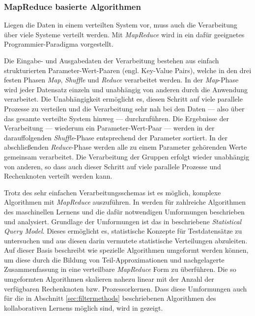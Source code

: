 \subsubsection{MapReduce basierte Algorithmen}\label{sec:mapred}

Liegen die Daten in einem verteilten System vor, muss auch die Verarbeitung über viele Systeme verteilt werden. Mit \textit{MapReduce} wird in \citep{mapred04} ein dafür geeignetes Programmier-Paradigma vorgestellt. 

 Die Eingabe- und Ausgabedaten der Verarbeitung bestehen aus einfach strukturierten Parameter-Wert-Paaren (engl. Key-Value Pairs), welche in den drei festen Phasen \textit{Map}, \textit{Shuffle} und \textit{Reduce} verarbeitet werden. In der \textit{Map}-Phase wird jeder Datensatz einzeln und unabhängig von anderen durch die Anwendung verarbeitet. Die Unabhängigkeit ermöglicht es, diesen Schritt auf viele parallele Prozesse zu verteilen und die Verarbeitung sehr nah bei den Daten --- also über das gesamte verteilte System hinweg --- durchzuführen. Die Ergebnisse der Verarbeitung --- wiederum ein Parameter-Wert-Paar --- werden in der darauffolgenden  \textit{Shuffle}-Phase entsprechend der Parameter sortiert. In der abschließenden  \textit{Reduce}-Phase werden alle zu einem Parameter gehörenden Werte gemeinsam verarbeitet. Die Verarbeitung der Gruppen erfolgt wieder unabhängig von anderen, so dass auch dieser Schritt auf viele parallele Prozesse und Rechenknoten verteilt werden kann. \citep{mapred04} 

Trotz des sehr einfachen Verarbeitungsschemas ist es möglich, komplexe Algorithmen mit \textit{MapReduce} auszuführen. In \citep{mapred06} werden für zahlreiche Algorithmen des maschinellen Lernens und die dafür notwendigen Umformungen beschrieben und analysiert. Grundlage der Umformungen ist das in \citep{Kearns98} beschriebene \textit{Statistical Query Model}. Dieses ermöglicht es, statistische Konzepte für Testdatensätze zu untersuchen und aus diesen darin vermutete statistische Verteilungen abzuleiten. Auf dieser Basis beschreibt \citep{mapred06} wie spezielle Algorithmen umgeformt werden können, um diese durch die Bildung von Teil-Approximationen und nachgelagerte Zusammenfassung in eine verteilbare \textit{MapReduce} Form zu überführen. Die so umgeformten Algorithmen skalieren nahezu linear mit der Anzahl der verfügbaren Rechenknoten bzw. Prozessorkernen. Dass diese Umformungen auch für die in Abschnitt \ref{sec:filtermethods}  beschriebenen Algorithmen des kollaborativen Lernens möglich sind, wird in \citep{jiang11} gezeigt. \citep{mapred06} 

